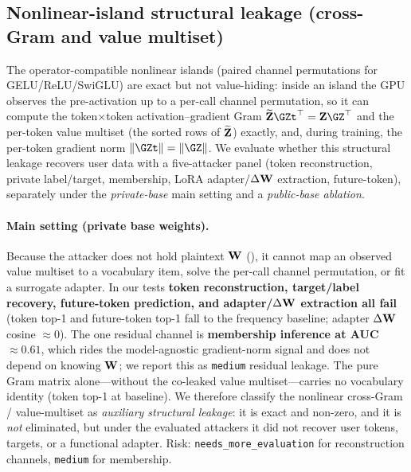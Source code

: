 \subsection{Nonlinear-island structural leakage (cross-Gram and value multiset)}
\label{sec:security:nonlinear}
The operator-compatible nonlinear islands (paired channel permutations for GELU/ReLU/SwiGLU) are exact but not value-hiding: inside an island the GPU observes the pre-activation up to a per-call channel permutation, so it can compute the token$\times$token activation--gradient Gram $\Zt\GZt^{\top} = \Z\GZ^{\top}$ and the per-token value multiset (the sorted rows of $\widetilde{\mathbf{Z}}$) exactly, and, during training, the per-token gradient norm $\lVert\GZt\rVert = \lVert\GZ\rVert$. We evaluate whether this structural leakage recovers user data with a five-attacker panel (token reconstruction, private label/target, membership, LoRA adapter/$\Delta\mathbf{W}$ extraction, future-token), separately under the \emph{private-base} main setting and a \emph{public-base ablation}.

\paragraph{Main setting (private base weights).}
Because the attacker does not hold plaintext $\mathbf{W}$ (), it cannot map an observed value multiset to a vocabulary item, solve the per-call channel permutation, or fit a surrogate adapter. In our tests \textbf{token reconstruction, target/label recovery, future-token prediction, and adapter/$\Delta\mathbf{W}$ extraction all fail} (token top-1 and future-token top-1 fall to the frequency baseline; adapter $\Delta\mathbf{W}$ cosine $\approx 0$). The one residual channel is \textbf{membership inference at AUC $\approx 0.61$}, which rides the model-agnostic gradient-norm signal and does not depend on knowing $\mathbf{W}$; we report this as \texttt{medium} residual leakage. The pure Gram matrix alone---without the co-leaked value multiset---carries no vocabulary identity (token top-1 at baseline). We therefore classify the nonlinear cross-Gram / value-multiset as \emph{auxiliary structural leakage}: it is exact and non-zero, and it is \emph{not} eliminated, but under the evaluated attackers it did not recover user tokens, targets, or a functional adapter. Risk: \texttt{needs\_more\_evaluation} for reconstruction channels, \texttt{medium} for membership.

